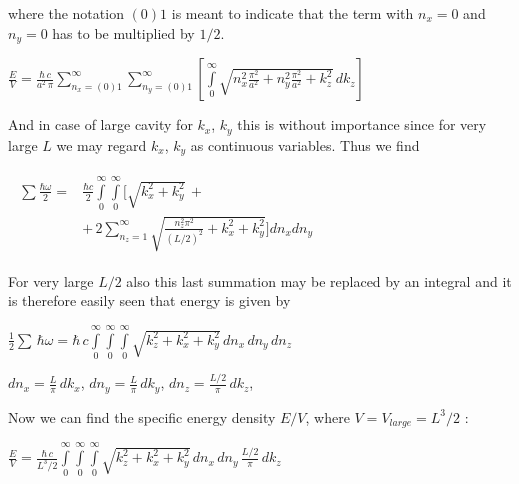 \documentclass[twoside, 10pt]{article}
\begin{document}
\begin{multicols}{2}
    where the notation \(\left(0\right) 1\) is meant to indicate that the
term with \(n_x = 0\) and \(n_y = 0\) has to be multiplied by
\(1\big/2\).

    \(\frac{E}{V} = \frac{\hbar\,c}{a^2\,\pi}\sum\limits_{n_x=(0)1}^{\infty}\sum\limits_{n_y=(0)1}^{\infty}\left[\int\limits_{0}^{\infty}\sqrt{n_x^2\frac{\pi^2}{a^2}+n_y^2\frac{\pi^2}{a^2}+k_z^2}\,dk_z\right]\)

    And in case of large cavity for \(k_x\), \(k_y\) this is without
importance since for very large \(L\) we may regard \(k_x\), \(k_y\) as
continuous variables. Thus we find


$\begin{array}{c}
\begin{array}{ll}
    \sum\frac{\hbar\omega}{2} = & \frac{\hbar c}{2}\int\limits_{0}^{\infty}\int\limits_{0}^{\infty}\Bigg[\sqrt{k_x^2+k_y^2}\,+ \\
   & +\,2\sum\limits_{n_z=1}^{\infty}\sqrt{\frac{n_z^2 \pi^2}{(L/2)^2}+k_x^2+k_y^2}\Bigg]d{n_x}d{n_y}
\end{array}
\end{array}$


    For very large \(L/2\) also this last summation may be replaced by an
integral and it is therefore easily seen that energy is given by

    \(\frac{1}{2}\sum\,\hbar\omega = \hbar\,c\int\limits_{0}^{\infty}\int\limits_{0}^{\infty}\int\limits_{0}^{\infty}\sqrt{k_z^2+k_x^2+k_y^2}\,d{n_x}\,d{n_y}\,d{n_z}\)

    \(dn_x = \frac{L}{\pi}\,dk_x\), \(dn_y = \frac{L}{\pi}\,dk_y\),
\(dn_z = \frac{L/2}{\pi}\,dk_z\),

    Now we can find the specific energy density \(E/V\), where
\(V = V_{large} = L^3/2\) :

    \(\frac{E}{V} = \frac{\hbar\,c}{L^3/2}\int\limits_{0}^{\infty}\int\limits_{0}^{\infty}\int\limits_{0}^{\infty}\sqrt{k_z^2+k_x^2+k_y^2}\,dn_x\,dn_y\,\frac{L/2}{\pi}\,dk_z\)



\end{multicols}
\end{document}
